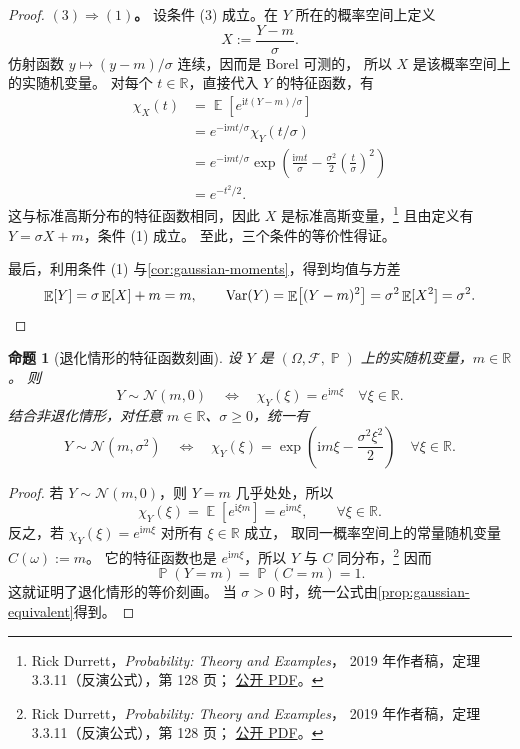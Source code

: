 \documentclass[UTF8,11pt,a4paper,oneside,fontset=fandol]{ctexrep}
\numberwithin{equation}{section}
\theoremstyle{plain}
\newtheorem{proposition}[theorem]{命题}
\theoremstyle{definition}
\theoremstyle{remark}
\newcommand{\R}{\mathbb{R}}
\newcommand{\F}{\mathcal{F}}
\DeclareMathOperator{\Prob}{\mathbb{P}}
\DeclareMathOperator{\E}{\mathbb{E}}
\DeclareMathOperator{\Var}{Var}
\begin{document}
\begin{proof}
\textbf{$(3)\Rightarrow(1)$。}
设条件 (3) 成立。在 $Y$ 所在的概率空间上定义
\[
  X:=\frac{Y-m}{\sigma}.
\]
仿射函数 $y\mapsto(y-m)/\sigma$ 连续，因而是 Borel 可测的，
所以 $X$ 是该概率空间上的实随机变量。
对每个 $t\in\R$，直接代入 $Y$ 的特征函数，有
\begin{align*}
  \chi_X(t)
  &=\E\!\left[e^{\mathrm{i}t(Y-m)/\sigma}\right]\\
  &=e^{-\mathrm{i}mt/\sigma}\chi_Y(t/\sigma)\\
  &=e^{-\mathrm{i}mt/\sigma}
       \exp\!\left(
         \frac{\mathrm{i}mt}{\sigma}
         -\frac{\sigma^2}{2}\left(\frac{t}{\sigma}\right)^2
       \right)\\
  &=e^{-t^2/2}.
\end{align*}
这与标准高斯分布的特征函数相同，因此 $X$ 是标准高斯变量，\footnote{%
Rick Durrett，\emph{Probability: Theory and Examples}，
2019 年作者稿，定理 3.3.11（反演公式），第 128 页；
\href{https://math.duke.edu/~rtd/PTE/PTE5_011119.pdf}{公开 PDF}。}
且由定义有 $Y=\sigma X+m$，条件 (1) 成立。
至此，三个条件的等价性得证。

最后，利用条件 (1) 与\cref{cor:gaussian-moments}，得到均值与方差
\[
  \E[Y]=\sigma\E[X]+m=m,\qquad
  \Var(Y)=\E\!\left[(Y-m)^2\right]
          =\sigma^2\E[X^2]=\sigma^2.\qedhere
\]
\end{proof}

\begin{proposition}[退化情形的特征函数刻画]
\label{prop:degenerate-characteristic}
设 $Y$ 是 $(\Omega,\F,\Prob)$ 上的实随机变量，$m\in\R$。
则
\[
  Y\sim\mathcal{N}(m,0)
  \quad\Longleftrightarrow\quad
  \chi_Y(\xi)=e^{\mathrm{i}m\xi}
  \quad\forall\xi\in\R.
\]
结合非退化情形，对任意 $m\in\R$、$\sigma\ge0$，统一有
\begin{equation}
  \label{eq:gaussian-characteristic-unified}
  Y\sim\mathcal{N}(m,\sigma^2)
  \quad\Longleftrightarrow\quad
  \chi_Y(\xi)
  =\exp\!\left(\mathrm{i}m\xi-\frac{\sigma^2\xi^2}{2}\right)
  \quad\forall\xi\in\R.
\end{equation}
\end{proposition}

\begin{proof}
若 $Y\sim\mathcal{N}(m,0)$，则 $Y=m$ 几乎处处，所以
\[
  \chi_Y(\xi)=\E\!\left[e^{\mathrm{i}\xi m}\right]
  =e^{\mathrm{i}m\xi},
  \qquad \forall\xi\in\R.
\]
反之，若 $\chi_Y(\xi)=e^{\mathrm{i}m\xi}$ 对所有 $\xi\in\R$ 成立，
取同一概率空间上的常量随机变量 $C(\omega):=m$。
它的特征函数也是 $e^{\mathrm{i}m\xi}$，所以 $Y$ 与 $C$ 同分布，\footnote{%
Rick Durrett，\emph{Probability: Theory and Examples}，
2019 年作者稿，定理 3.3.11（反演公式），第 128 页；
\href{https://math.duke.edu/~rtd/PTE/PTE5_011119.pdf}{公开 PDF}。}
因而
\[
  \Prob(Y=m)=\Prob(C=m)=1.
\]
这就证明了退化情形的等价刻画。
当 $\sigma>0$ 时，统一公式由\cref{prop:gaussian-equivalent}得到。
\end{proof}
\end{document}
